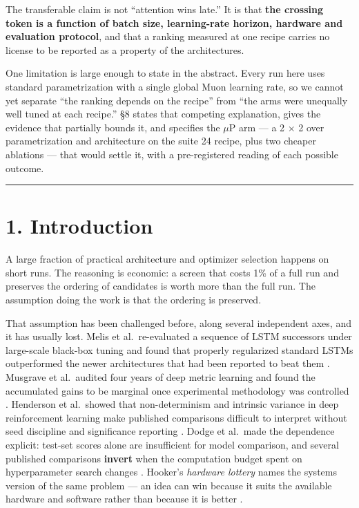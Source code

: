 The transferable claim is not ``attention wins late.'' It is that \textbf{the crossing token is a
function of batch size, learning-rate horizon, hardware and evaluation protocol}, and that a
ranking measured at one recipe carries no license to be reported as a property of the
architectures.

One limitation is large enough to state in the abstract. Every run here uses standard
parametrization with a single global Muon learning rate, so we cannot yet separate ``the ranking
depends on the recipe'' from ``the arms were unequally well tuned at each recipe.'' \S8 states that
competing explanation, gives the evidence that partially bounds it, and specifies the $\mu$P arm ---
a 2 $\times$ 2 over parametrization and architecture on the suite 24 recipe, plus two cheaper ablations ---
that would settle it, with a pre-registered reading of each possible outcome.

\begin{center}\rule{0.5\linewidth}{0.5pt}\end{center}

\section{1. Introduction}\label{introduction}

A large fraction of practical architecture and optimizer selection happens on short runs. The
reasoning is economic: a screen that costs 1\% of a full run and preserves the ordering of
candidates is worth more than the full run. The assumption doing the work is that the ordering is
preserved.

That assumption has been challenged before, along several independent axes, and it has usually
lost. Melis et al.~re-evaluated a sequence of LSTM successors under large-scale black-box tuning
and found that properly regularized standard LSTMs outperformed the newer architectures that had
been reported to beat them \cite{ref6}. Musgrave et al.~audited four years of deep metric learning and
found the accumulated gains to be marginal once experimental methodology was controlled \cite{ref38}.
Henderson et al.~showed that non-determinism and intrinsic variance in deep reinforcement learning
make published comparisons difficult to interpret without seed discipline and significance
reporting \cite{ref8}. Dodge et al.~made the dependence explicit: test-set scores alone are insufficient
for model comparison, and several published comparisons \textbf{invert} when the computation budget
spent on hyperparameter search changes \cite{ref7}. Hooker's \emph{hardware lottery} names the systems version
of the same problem --- an idea can win because it suits the available hardware and software rather
than because it is better \cite{ref26}.

